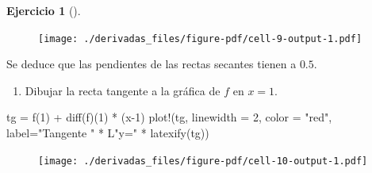 \documentclass[
  a4paper,
]{scrreport}
\newenvironment{Shaded}{\begin{snugshade}}{\end{snugshade}}
\newcommand{\FloatTok}[1]{\textcolor[rgb]{0.68,0.00,0.00}{#1}}
\newcommand{\FunctionTok}[1]{\textcolor[rgb]{0.28,0.35,0.67}{#1}}
\newcommand{\NormalTok}[1]{\textcolor[rgb]{0.00,0.23,0.31}{#1}}
\newcommand{\OperatorTok}[1]{\textcolor[rgb]{0.37,0.37,0.37}{#1}}
\newcommand{\StringTok}[1]{\textcolor[rgb]{0.13,0.47,0.30}{#1}}
\providecommand{\tightlist}{%
  \setlength{\itemsep}{0pt}\setlength{\parskip}{0pt}}\usepackage{longtable,booktabs,array}
\theoremstyle{definition}
\newtheorem{exercise}{Ejercicio}[chapter]
\theoremstyle{remark}
\begin{document}
\begin{exercise}[]
\begin{tcolorbox}
\begin{figure}[H]

{\centering \texttt{[image: ./derivadas\_files/figure-pdf/cell-9-output-1.pdf]}

}

\end{figure}

Se deduce que las pendientes de las rectas secantes tienen a \(0.5\).

\end{tcolorbox}

\begin{enumerate}
\def\labelenumi{\alph{enumi}.}
\setcounter{enumi}{1}
\tightlist
\item
  Dibujar la recta tangente a la gráfica de \(f\) en \(x=1\).
\end{enumerate}

\begin{tcolorbox}[enhanced jigsaw, toprule=.15mm, arc=.35mm, bottomrule=.15mm, titlerule=0mm, bottomtitle=1mm, opacitybacktitle=0.6, colbacktitle=quarto-callout-tip-color!10!white, colframe=quarto-callout-tip-color-frame, opacityback=0, title=\textcolor{quarto-callout-tip-color}{\faLightbulb}\hspace{0.5em}{Solución}, breakable, colback=white, toptitle=1mm, leftrule=.75mm, coltitle=black, rightrule=.15mm, left=2mm]

\begin{Shaded}
\begin{Highlighting}[]
\NormalTok{tg }\OperatorTok{=} \FunctionTok{f}\NormalTok{(}\FloatTok{1}\NormalTok{) }\OperatorTok{+} \FunctionTok{diff}\NormalTok{(f)(}\FloatTok{1}\NormalTok{) }\OperatorTok{*}\NormalTok{ (x}\OperatorTok{{-}}\FloatTok{1}\NormalTok{)}
\FunctionTok{plot!}\NormalTok{(tg, linewidth }\OperatorTok{=} \FloatTok{2}\NormalTok{, color }\OperatorTok{=} \StringTok{"red"}\NormalTok{, label}\OperatorTok{=}\StringTok{"Tangente "} \OperatorTok{*}\NormalTok{ L}\StringTok{"y="} \OperatorTok{*} \FunctionTok{latexify}\NormalTok{(tg))}
\end{Highlighting}
\end{Shaded}

\begin{figure}[H]

{\centering \texttt{[image: ./derivadas\_files/figure-pdf/cell-10-output-1.pdf]}

}

\end{figure}

\end{tcolorbox}

\end{exercise}
\end{document}
